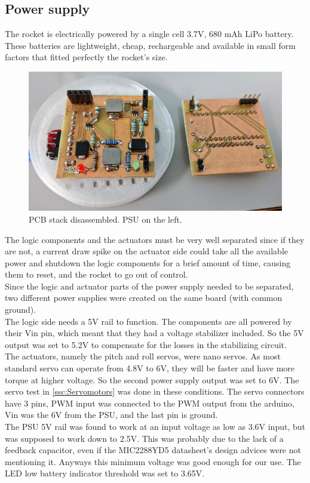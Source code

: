 \subsection{Power supply}
The rocket is electrically powered by a single cell 3.7V, 680 mAh LiPo battery. These batteries are lightweight, cheap, rechargeable and available in small form factors that fitted perfectly the rocket's size. \\

\begin{figure} [h]
	\centering
	\includegraphics[width=0.8\linewidth]{figures/Rocket/implementation/psu_board.jpg}
	\caption{PCB stack disassembled. PSU on the left.}
	\label{fig:PSU_board}
\end{figure}

The logic components and the actuators must be very well separated since if they are not, a current draw spike on the actuator side could take all the available power and shutdown the logic components for a brief amount of time, causing them to reset, and the rocket to go out of control. \\
Since the logic and actuator parts of the power supply needed to be separated, two different power supplies were created on the same board (with common ground). \\
The logic side needs a 5V rail to function. The components are all powered by their Vin pin, which meant that they had a voltage stabilizer included. So the 5V output was set to 5.2V to compensate for the losses in the stabilizing circuit. \\
The actuators, namely the pitch and roll servos, were nano servos. As most standard servo can operate from 4.8V to 6V, they will be faster and have more torque at higher voltage. So the second power supply output was set to 6V. The servo test in \autoref{ssc:Servomotors} was done in these conditions. The servo connectors have 3 pins, PWM input was connected to the PWM output from the arduino, Vin was the 6V from the PSU, and the last pin is ground. \\
The PSU 5V rail was found to work at an input voltage as low as 3.6V input, but was supposed to work down to 2.5V. This was probably due to the lack of a feedback capacitor, even if the MIC2288YD5 datasheet's design advices \cite{datasheet:MIC2288} were not mentioning it. Anyways this minimum voltage was good enough for our use. The LED low battery indicator threshold was set to 3.65V.

